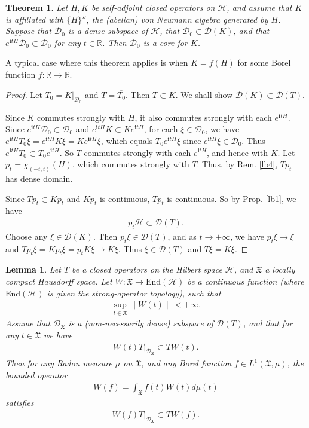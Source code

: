\documentclass[12pt,a4paper,notitlepage]{article}
\theoremstyle{definition}
\theoremstyle{plain}
\newtheorem{thm}[df]{Theorem}
\newtheorem{lm}[df]{Lemma}
\newcommand{\fk}{\mathfrak}
\newcommand{\mc}{\mathcal}
\newcommand{\ovl}{\overline}
\newcommand{\End}{\mathrm{End}} %
\newcommand{\Dom}{\scr D}
\newcommand{\scr}{\mathscr}
\newcommand{\im}{\mathbf{i}}
\newcommand{\mbb}{\mathbb}
\newcommand{\Rbb}{\mathbb R}
\numberwithin{equation}{subsection}
\begin{document}
\begin{thm}\label{lb3}
Let $H,K$ be  self-adjoint closed operators on $\mc H$, and assume that $K$ is  affiliated with $\{H\}''$, the (abelian) von Neumann algebra generated by $H$. Suppose that $\scr D_0$ is a dense subspace of $\mc H$, that $\scr D_0\subset\Dom(K)$, and that $e^{\im tH}\scr D_0\subset\scr D_0$ for any $t\in\mbb R$. Then $\scr D_0$ is a core for $K$.
\end{thm}


A typical case where this theorem applies is when $K=f(H)$ for some Borel function $f:\Rbb\rightarrow\Rbb$.



\begin{proof}
Let $T_0=K|_{\scr D_0}$ and $T=\ovl{T_0}$. Then $T\subset K$. We shall show $\Dom(K)\subset\Dom(T)$. 

Since $K$ commutes strongly with $H$, it also commutes strongly with each $e^{\im tH}$. Since  $e^{\im tH}\scr D_0\subset\scr D_0$ and $e^{\im tH}K\subset Ke^{\im tH}$, for each $\xi\in\Dom_0$, we have $e^{\im tH}T_0\xi=e^{\im tH}K\xi=Ke^{\im tH}\xi$, which equals $T_0e^{\im tH}\xi$ since $e^{\im tH}\xi\in\Dom_0$. Thus $e^{\im tH}T_0\subset T_0e^{\im tH}$. So $T$ commutes strongly with each $e^{\im tH}$, and hence with $K$. Let $p_t=\chi_{(-t,t)}(H)$, which commutes strongly with $T$. Thus, by Rem. \ref{lb4}, $Tp_t$ has dense domain.

Since $Tp_t\subset Kp_t$ and $Kp_t$ is continuous, $Tp_t$ is  continuous. So by Prop. \ref{lb1}, we have
\begin{align*}
p_t\mc H\subset\Dom(T).	
\end{align*}
Choose any $\xi\in\Dom(K)$. Then $p_t\xi\in\Dom(T)$, and as $t\rightarrow+\infty$, we have $p_t\xi\rightarrow\xi$ and  $Tp_t\xi=Kp_t\xi=p_tK\xi\rightarrow K\xi$. Thus $\xi\in\Dom(T)$ and $T\xi=K\xi$.
\end{proof}

\begin{lm}\label{lb2}
Let $T$ be a closed operators on the Hilbert space $\mathcal H$,   and $\mathfrak X$  a locally compact Hausdorff space. Let  $W:\mathfrak X\rightarrow \End(\mathcal H)$ be a continuous function (where $\End(\mathcal H)$ is given the strong-operator topology), such that
\begin{align*}
\sup_{t\in\fk X}	\lVert W(t)\lVert<+\infty.
\end{align*}
Assume that $\Dom_{\fk X}$ is a (non-necessarily dense) subspace of $\Dom(T)$, and that for any $t\in\mathfrak X$ we have
\begin{align}
W(t)T\big|_{\Dom_{\fk X}}\subset TW(t).\label{eq4}
\end{align}
	Then for any Radon measure $\mu$ on $\mathfrak X$, and any Borel function $f\in L^1(\mathfrak X,\mu)$, the bounded operator
	\begin{align}
		W(f)=\int_{\mathfrak X}f(t)W(t)d\mu(t)\label{eq2}
	\end{align}
	satisfies
	\begin{align}
W(f)T\big|_{\Dom_{\fk X}}\subset TW(f).\label{eq1}
	\end{align}
\end{lm}
\end{document}

